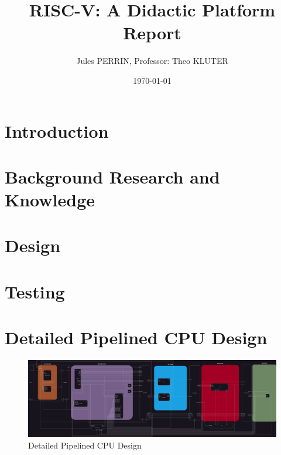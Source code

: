 \documentclass[12pt]{article}
\title{RISC-V: A Didactic Platform \\
Report}
\author{Jules PERRIN, Professor: Theo KLUTER}
\date{\today}
\begin{document}
\maketitle
\tableofcontents

\section{Introduction}




\section{Background Research and Knowledge}






\section{Design}




\section{Testing}


\printbibliography[heading=bibintoc]

\appendix
\section{Detailed Pipelined CPU Design}
\label{appendix:pipelined_design}
\begin{figure}
    \centering
    \includegraphics[width=\textheight]{appendix/images/pipelined_design_detail.png} %
    \caption{Detailed Pipelined CPU Design}
\end{figure}
\end{document}
